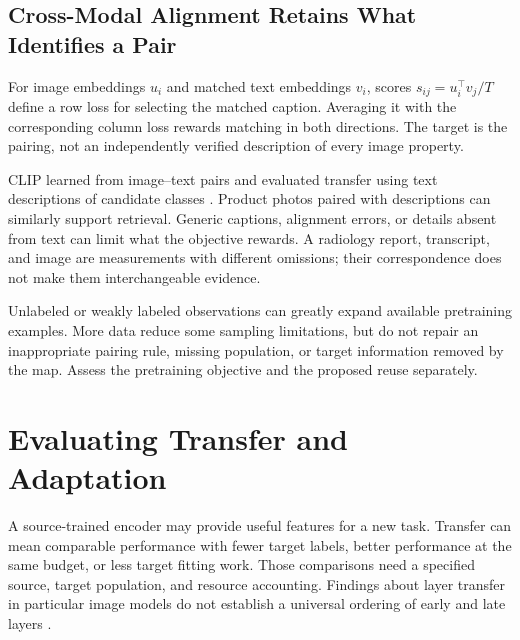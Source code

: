 \subsection{Cross-Modal Alignment Retains What Identifies a Pair}

For image embeddings $u_i$ and matched text embeddings $v_i$, scores $s_{ij}=u_i^\top v_j/T$ define a row loss for selecting the matched caption. Averaging it with the corresponding column loss rewards matching in both directions. The target is the pairing, not an independently verified description of every image property.

CLIP learned from image--text pairs and evaluated transfer using text descriptions of candidate classes \citep{radford2021clip}. Product photos paired with descriptions can similarly support retrieval. Generic captions, alignment errors, or details absent from text can limit what the objective rewards. A radiology report, transcript, and image are measurements with different omissions; their correspondence does not make them interchangeable evidence.

Unlabeled or weakly labeled observations can greatly expand available pretraining examples. More data reduce some sampling limitations, but do not repair an inappropriate pairing rule, missing population, or target information removed by the map. Assess the pretraining objective and the proposed reuse separately.

\section{Evaluating Transfer and Adaptation}

A source-trained encoder may provide useful features for a new task. Transfer can mean comparable performance with fewer target labels, better performance at the same budget, or less target fitting work. Those comparisons need a specified source, target population, and resource accounting. Findings about layer transfer in particular image models do not establish a universal ordering of early and late layers \citep{yosinski2014transfer,kornblith2019transfer}.

